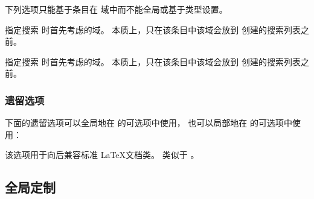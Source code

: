 下列选项只能基于条目在  域中而不能全局或基于类型设置。

\begin{optionlist}


指定搜索  时首先考虑的域。
本质上，只在该条目中该域会放到  创建的搜索列表之前。


指定搜索  时首先考虑的域。
本质上，只在该条目中该域会放到  创建的搜索列表之前。

\end{optionlist}

\subsubsection{遗留选项}%

下面的遗留选项可以全局地在  的可选项中使用，
也可以局部地在  的可选项中使用：

\begin{optionlist}
	
\DeprecatedMark  %
该选项用于向后兼容标准 \LaTeX 文档类。
 类似于 。

\end{optionlist}

\subsection{全局定制}%
\label{use:cfg}

